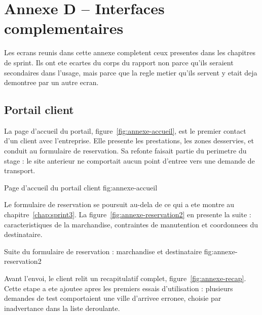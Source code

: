 \cleardoublepage
\section*{Annexe D -- Interfaces complementaires}

Les ecrans reunis dans cette annexe completent ceux presentes dans les
chapitres de sprint. Ils ont ete ecartes du corps du rapport non parce
qu'ils seraient secondaires dans l'usage, mais parce que la regle metier
qu'ils servent y etait deja demontree par un autre ecran.

\subsection*{Portail client}

La page d'accueil du portail, figure~\ref{fig:annexe-accueil}, est le
premier contact d'un client avec l'entreprise. Elle presente les
prestations, les zones desservies, et conduit au formulaire de
reservation. Sa refonte faisait partie du perimetre du stage : le site
anterieur ne comportait aucun point d'entree vers une demande de
transport.

  {Page d'accueil du portail client}
  {fig:annexe-accueil}

Le formulaire de reservation se poursuit au-dela de ce qui a ete montre
au chapitre~\ref{chap:sprint3}. La figure~\ref{fig:annexe-reservation2}
en presente la suite : caracteristiques de la marchandise, contraintes de
manutention et coordonnees du destinataire.

  {Suite du formulaire de reservation : marchandise et destinataire}
  {fig:annexe-reservation2}

Avant l'envoi, le client relit un recapitulatif complet,
figure~\ref{fig:annexe-recap}. Cette etape a ete ajoutee apres les
premiers essais d'utilisation : plusieurs demandes de test comportaient
une ville d'arrivee erronee, choisie par inadvertance dans la liste
deroulante.

